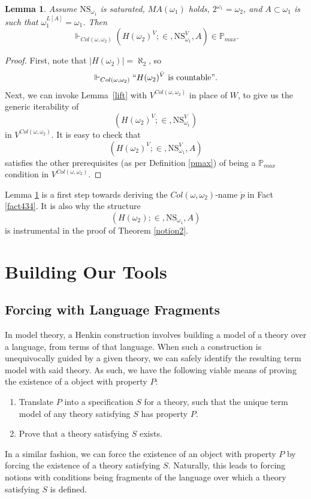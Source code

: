 \documentclass[12pt, twoside]{memoir}
\numberwithin{equation}{section}
\newtheorem{lem}[thm]{Lemma}
\theoremstyle{definition}
\theoremstyle{remark}
\theoremstyle{definition}
\theoremstyle{definition}
\theoremstyle{definition}
\theoremstyle{remark}
\begin{document}
\begin{lem}\label{ho2}
Assume $\mathrm{NS}_{\omega_1}$ is saturated, $MA(\omega_1)$ holds, $2^{\omega_1} = \omega_2$, and $A \subset \omega_1$ is such that $\omega_1^{L[A]} = \omega_1$. Then $$\Vdash_{Col(\omega, \omega_2)} (H(\omega_2)^{\dot{V}}; \in, \mathrm{NS}_{\omega_1}^{\dot{V}}, A) \in \mathbb{P}_{max}.$$
\end{lem}
\begin{proof}
First, note that $|H(\omega_2)| = \aleph_2$, so $$\Vdash_{Col(\omega, \omega_2)} ``H(\omega_2)^{\dot{V}} \text{ is countable}".$$ Next, we can invoke Lemma~\ref{lift} with $V^{Col(\omega, \omega_2)}$ in place of $W$, to give us the generic iterability of $$(H(\omega_2)^{V}; \in, \mathrm{NS}_{\omega_1}^V)$$ in $V^{Col(\omega, \omega_2)}$. It is easy to check that $$(H(\omega_2)^{V}; \in, \mathrm{NS}_{\omega_1}^V, A)$$ satisfies the other prerequisites (as per Definition \ref{pmax}) of being a $\mathbb{P}_{max}$ condition in $V^{Col(\omega, \omega_2)}$. 
\end{proof}

Lemma \ref{ho2} is a first step towards deriving the $Col(\omega, \omega_2)$-name $\dot{p}$ in Fact \ref{fact434}. It is also why the structure 
\begin{equation*}
    (H(\omega_2); \in, \mathrm{NS}_{\omega_1}, A)
\end{equation*}
is instrumental in the proof of Theorem \ref{notion2}.

\part{Building Our Tools}\label{part2}

\chapter{Forcing with Language Fragments}\label{setupsec}

In model theory, a Henkin construction involves building a model of a theory over a language, from terms of that language. When such a construction is unequivocally guided by a given theory, we can safely identify the resulting term model with said theory. As such, we have the following viable means of proving the existence of a object with property $P$: 
\begin{enumerate}
    \item Translate $P$ into a specification $S$ for a theory, such that the unique term model of any theory satisfying $S$ has property $P$.
    \item Prove that a theory satisfying $S$ exists.
\end{enumerate}
In a similar fashion, we can force the existence of an object with property $P$ by forcing the existence of a theory satisfying $S$. Naturally, this leads to forcing notions with conditions being fragments of the language over which a theory satisfying $S$ is defined.
\end{document}
